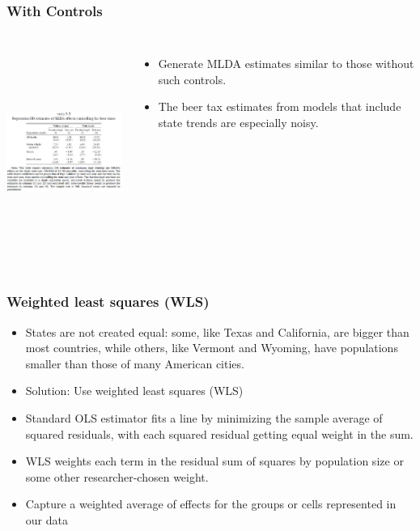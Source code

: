 \documentclass{beamer}
\begin{document}
\begin{frame}
\frametitle{With Controls}

 \begin{columns}
\includegraphics[width=6cm,height=7cm,keepaspectratio]{Table 5.3} 

\begin{itemize}
	\item Generate MLDA estimates similar to those without such controls.
	\item The beer tax estimates from models that include state trends are especially noisy.

\end{itemize}

\end{columns}

\end{frame}



\begin{frame}
\frametitle{Weighted least squares (WLS)}
	\begin{itemize}
		\item States are not created equal: some, like Texas and California, are bigger than most countries, while others, like Vermont and Wyoming, have populations smaller than those of many American cities.
		\item Solution: Use weighted least squares (WLS)
		\item Standard OLS estimator fits a line by minimizing the sample average of squared residuals, with each squared residual getting equal weight in the sum.
		\item WLS weights each term in the residual sum of squares by population size or some other researcher-chosen weight.
		\item Capture a weighted average of effects for the groups or cells represented in our data

	\end{itemize}

\end{frame}
\end{document}
